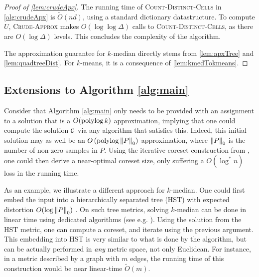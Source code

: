 \begin{proof}[Proof of \cref{lem:crudeApx}]
The running time of \textsc{Count-Distinct-Cells} in \cref{alg:crudeApx} is $\tilde O(nd)$, using a standard dictionary datastructure. To compute $U$,
\textsc{Crude-Approx} makes $O(\log \log \Delta)$ calls to \textsc{Count-Distinct-Cells}, as there are $O(\log \Delta)$ levels. This concludes the complexity of
the algorithm.

The approximation guarantee for $k$-median directly stems from \cref{lem:apxTree} and \cref{lem:quadtreeDist}. For $k$-means, it is a consequence of \cref{lem:kmedTokmeans}.
\end{proof}


\subsection{Extensions to Algorithm \ref{alg:main}}
\label{app:extensions}

Consider that Algorithm \ref{alg:main} only needs to be provided with an assignment to a solution that is a $O(\operatorname{polylog} k)$ approximation, implying that one
could compute the solution $\mathcal C$ via any algorithm that satisfies this.  Indeed, this initial solution may as well be an $O\left(\operatorname{polylog} \left\| P \right\|_0 \right)$
approximation, where $\left\| P \right\|_0$ is the number of non-zero samples in $P$. Using the iterative coreset construction from \cite{BravermanJKW21}, one could
then derive a near-optimal coreset size, only suffering a $O(\log^* n)$ loss in the running time.

As an example, we illustrate a different approach for $k$-median. One could first embed the input into a hierarchically separated tree (HST) with expected
distortion $O(\log \left\| P \right\|_0)$ \cite{FakcharoenpholRT03}. On such tree metrics, solving $k$-median can be done in linear time using dedicated algorithms
(see e.g. \cite{Cohen-AddadLNSS21}). Using the solution from the HST metric, one can compute a coreset, and iterate using the previous argument.  This embedding
into HST is very similar to what is done by the \fkmeans algorithm, but can be actually performed in \emph{any} metric space, not only Euclidean.  For instance,
in a metric described by a graph with $m$ edges, the running time of this construction would be near linear-time $\tilde O(m)$.

